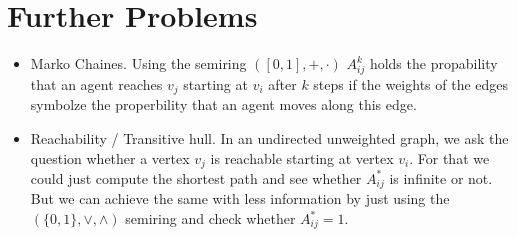 \section{Further Problems}
\begin{itemize}
    \item Marko Chaines. Using the semiring $([0, 1], +, \cdot)$ $A^k_{ij}$ holds the propability that an agent reaches $v_j$ starting at $v_i$ after $k$ steps if the weights of the edges symbolze the properbility that an agent moves along this edge.
    \item Reachability / Transitive hull. In an undirected unweighted graph, we ask the question whether a vertex $v_j$ is reachable starting at vertex $v_i$. For that we could just compute the shortest path and see whether $A^*_{ij}$ is infinite or not. But we can achieve the same with less information by just using the $(\{0, 1\}, \lor, \land)$ semiring and check whether $A^*_{ij} = 1$.
\end{itemize}